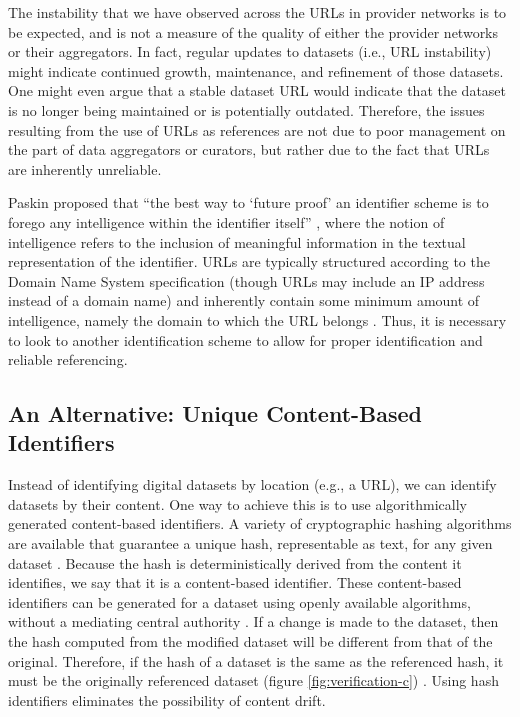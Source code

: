 The instability that we have observed across the URLs in provider networks is to be expected, and is not a measure of the quality of either the provider networks or their aggregators. In fact, regular updates to datasets (i.e., URL instability) might indicate continued growth, maintenance, and refinement of those datasets. One might even argue that a stable dataset URL would indicate that the dataset is no longer being maintained or is potentially outdated. Therefore, the issues resulting from the use of URLs as references are not due to poor management on the part of data aggregators or curators, but rather due to the fact that URLs are inherently unreliable.

Paskin proposed that ``the best way to `future proof' an identifier scheme is to forego any intelligence within the identifier itself'' \citep{Paskin_1999}, where the notion of intelligence refers to the inclusion of meaningful information in the textual representation of the identifier. URLs are typically structured according to the Domain Name System specification (though URLs may include an IP address instead of a domain name) and inherently contain some minimum amount of intelligence, namely the domain to which the URL belongs \citep{rfc1034}. Thus, it is necessary to look to another identification scheme to allow for proper identification and reliable referencing.

\subsection*{An Alternative: Unique Content-Based Identifiers}
Instead of identifying digital datasets by location (e.g., a URL), we can identify datasets by their content. One way to achieve this is to use algorithmically generated content-based identifiers. A variety of cryptographic hashing algorithms are available that guarantee a unique hash, representable as text, for any given dataset . Because the hash is deterministically derived from the content it identifies, we say that it is a content-based identifier. These content-based identifiers can be generated for a dataset using openly available algorithms, without a mediating central authority \citep{Paskin_1999}. If a change is made to the dataset, then the hash computed from the modified dataset will be different from that of the original. Therefore, if the hash of a dataset is the same as the referenced hash, it must be the originally referenced dataset (figure \ref{fig:verification-c}) . Using hash identifiers eliminates the possibility of content drift.

